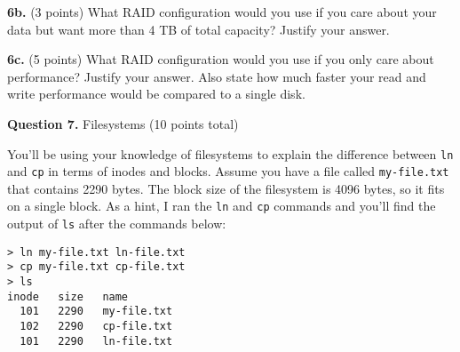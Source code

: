 \documentclass[12pt]{article}
\begin{document}
\textbf{6b.} (3 points)
What RAID configuration would you use if you care about your data but want more
than 4 TB of total capacity?
Justify your answer.


\textbf{6c.} (5 points)
What RAID configuration would you use if you only care about performance?
Justify your answer.
Also state how much faster your read and write performance would be compared to
a single disk.


\newpage

\textbf{Question 7.} Filesystems (10 points total)

\vspace{1em}

You'll be using your knowledge of filesystems to explain the difference between
\texttt{ln} and \texttt{cp} in terms of inodes and blocks.
Assume you have a file called \texttt{my-file.txt} that contains 2290 bytes.
The block size of the filesystem is 4096 bytes, so it fits on a single block.
As a hint, I ran the \texttt{ln} and \texttt{cp} commands and you'll find the
output of \texttt{ls} after the commands below:

\vspace{1em}

\begin{lstlisting}
> ln my-file.txt ln-file.txt
> cp my-file.txt cp-file.txt
> ls
inode   size   name
  101   2290   my-file.txt
  102   2290   cp-file.txt
  101   2290   ln-file.txt
\end{lstlisting}
\end{document}
